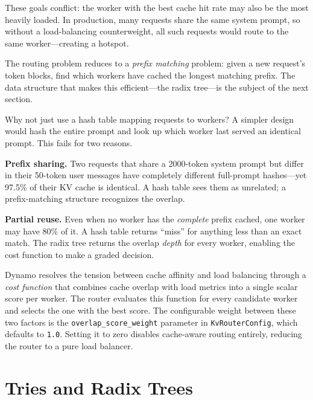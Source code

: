 These goals conflict: the worker with the best cache hit rate may also be the most heavily loaded. In production, many requests share the same system prompt, so without a load-balancing counterweight, all such requests would route to the same worker---creating a hotspot.

\begin{insightbox}
The routing problem reduces to a \emph{prefix matching} problem: given a new request's token blocks, find which workers have cached the longest matching prefix. The data structure that makes this efficient---the radix tree---is the subject of the next section.
\end{insightbox}

\begin{whynotbox}{Why not just use a hash table mapping requests to workers?}
A simpler design would hash the entire prompt and look up which worker last served an identical prompt. This fails for two reasons.

\textbf{Prefix sharing.} Two requests that share a 2000-token system prompt but differ in their 50-token user messages have completely different full-prompt hashes---yet 97.5\% of their KV cache is identical. A hash table sees them as unrelated; a prefix-matching structure recognizes the overlap.

\textbf{Partial reuse.} Even when no worker has the \emph{complete} prefix cached, one worker may have 80\% of it. A hash table returns ``miss'' for anything less than an exact match. The radix tree returns the overlap \emph{depth} for every worker, enabling the cost function to make a graded decision.
\end{whynotbox}

Dynamo resolves the tension between cache affinity and load balancing through a \emph{cost function} that combines cache overlap with load metrics into a single scalar score per worker. The router evaluates this function for every candidate worker and selects the one with the best score. The configurable weight between these two factors is the \texttt{overlap\_score\_weight} parameter in \texttt{KvRouterConfig}, which defaults to \texttt{1.0}. Setting it to zero disables cache-aware routing entirely, reducing the router to a pure load balancer.

\section{Tries and Radix Trees}
\label{sec:kvrouter:trie}

